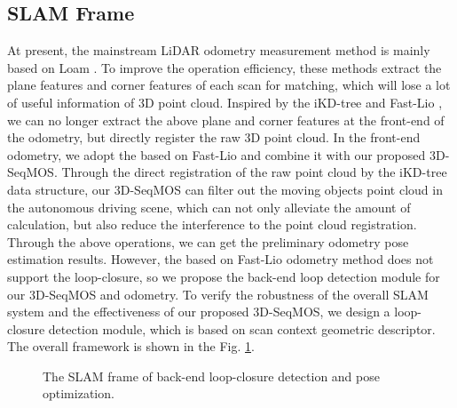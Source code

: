 \documentclass[lettersize,journal]{IEEEtran}
\begin{document}
\subsection{SLAM Frame}
At present, the mainstream LiDAR odometry measurement method is mainly based on Loam \cite{zhang2014loam}. To improve the operation efficiency, these methods extract the plane features and corner features of each scan for matching, which will lose a lot of useful information of 3D point cloud. Inspired by the iKD-tree \cite{cai2021ikd} and Fast-Lio \cite{xu2021fast}, we can no longer extract the above plane and corner features at the front-end of the odometry, but directly register the raw 3D point cloud. In the front-end odometry, we adopt the based on Fast-Lio and combine it with our proposed 3D-SeqMOS. Through the direct registration of the raw point cloud by the iKD-tree data structure, our 3D-SeqMOS can filter out the moving objects point cloud in the autonomous driving scene, which can not only alleviate the amount of calculation, but also reduce the interference to the point cloud registration. Through the above operations, we can get the preliminary odometry pose estimation results. However, the based on Fast-Lio odometry method does not support the loop-closure, so we propose the back-end loop detection module for our 3D-SeqMOS and odometry. To verify the robustness of the overall SLAM system and the effectiveness of our proposed 3D-SeqMOS, we design a loop-closure detection module, which is based on scan context geometric descriptor. The overall framework is shown in the Fig. \ref{fig4}.

\begin{figure}[h]
\centering
\vskip 0.2in
\caption{The SLAM frame of back-end loop-closure detection and pose optimization.}
\label{fig4}
\end{figure}
\end{document}
